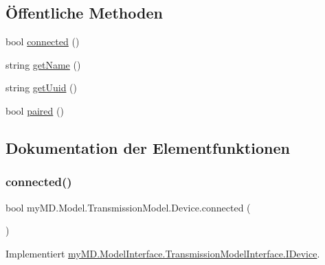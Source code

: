 \subsection*{Öffentliche Methoden}
\begin{DoxyCompactItemize}
\item 
bool \mbox{\hyperlink{classmy_m_d_1_1_model_1_1_transmission_model_1_1_device_a929ac575030efc1810879551f92f6a61}{connected}} ()
\item 
string \mbox{\hyperlink{classmy_m_d_1_1_model_1_1_transmission_model_1_1_device_ad3410ee962b5a3253e4ef99651b80c44}{get\+Name}} ()
\item 
string \mbox{\hyperlink{classmy_m_d_1_1_model_1_1_transmission_model_1_1_device_a84a4d532edd011e5eabd0b6939b1e91c}{get\+Uuid}} ()
\item 
bool \mbox{\hyperlink{classmy_m_d_1_1_model_1_1_transmission_model_1_1_device_af8485fc857a036d58e8b1ba38e7d098a}{paired}} ()
\end{DoxyCompactItemize}


\subsection{Dokumentation der Elementfunktionen}
\mbox{\label{classmy_m_d_1_1_model_1_1_transmission_model_1_1_device_a929ac575030efc1810879551f92f6a61}} 
\subsubsection{\texorpdfstring{connected()}{connected()}}
{\footnotesize\ttfamily bool my\+M\+D.\+Model.\+Transmission\+Model.\+Device.\+connected (\begin{DoxyParamCaption}{ }\end{DoxyParamCaption})}



Implementiert \mbox{\hyperlink{interfacemy_m_d_1_1_model_interface_1_1_transmission_model_interface_1_1_i_device_ab43328062cfb240bc8b942f77635aa86}{my\+M\+D.\+Model\+Interface.\+Transmission\+Model\+Interface.\+I\+Device}}.

\mbox{\label{classmy_m_d_1_1_model_1_1_transmission_model_1_1_device_ad3410ee962b5a3253e4ef99651b80c44}} 
